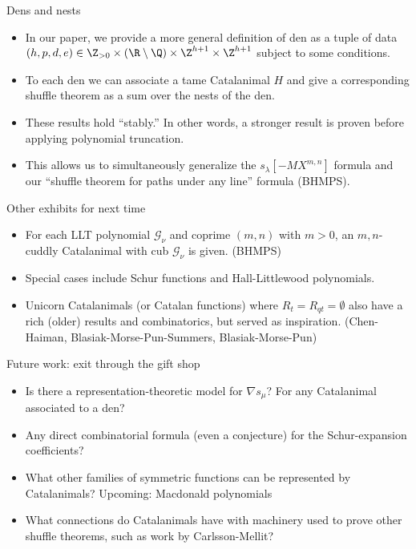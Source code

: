 \documentclass{beamer}
\newcommand{\Gcal}{\mathcal{G}}
\newcounter{c}
\begin{document}
\begin{frame}{Dens and nests}
  \begin{itemize}
  \item In our paper, we provide a more general definition of den as a
    tuple of data \((h,p,d,e) \in \Z_{>0} \times (\R \setminus \Q)
    \times \Z^{h+1} \times \Z^{h+1}\) subject to some conditions.\pause 
  \item To each den we can
    associate a tame Catalanimal \(H\) and give a corresponding
    shuffle theorem as a sum over the nests of the den.\pause
  \item These results hold ``stably.'' In other words, a stronger result is
    proven before applying polynomial truncation.\pause
  \item This allows us to simultaneously generalize the
    \(s_\lambda[-MX^{m,n}]\) formula and our ``shuffle theorem for
    paths under any line'' formula (BHMPS).
  \end{itemize}
\end{frame}
\begin{frame}{Other exhibits for next time}
  \begin{itemize}
  \item For each LLT polynomial \(\Gcal_\nu\) and coprime \((m,n)\) with \(m > 0\), an
    \(m,n\)-cuddly Catalanimal with cub \(\Gcal_\nu\) is given. (BHMPS)\pause
  \item Special cases include Schur functions and Hall-Littlewood
    polynomials.\pause
  \item Unicorn Catalanimals (or Catalan functions) where
    \(R_t = R_{qt} = \emptyset\) also have a rich
    (older) results and combinatorics, but served as
    inspiration. (Chen-Haiman, Blasiak-Morse-Pun-Summers, Blasiak-Morse-Pun)
  \end{itemize}
\end{frame}
\begin{frame}{Future work: exit through the gift shop}
  \begin{itemize}
  \item Is there a representation-theoretic model for \(\nabla
    s_\mu\)? For any Catalanimal associated to a den?\pause
  \item Any direct combinatorial formula (even a conjecture) for the Schur-expansion coefficients?\pause
  \item What other families of symmetric functions can be represented
    by Catalanimals? \pause Upcoming: Macdonald polynomials\pause
  \item What connections do Catalanimals have with machinery used to
    prove other shuffle theorems, such as work by Carlsson-Mellit?
  \end{itemize}
\end{frame}
\end{document}
